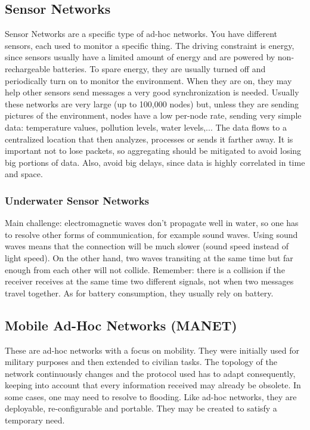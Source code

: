 \subsection{Sensor Networks}
Sensor Networks are a specific type of ad-hoc networks. You have 
different sensors, each used to monitor a specific thing. The driving constraint 
is energy, since sensors usually have a limited amount of energy and are powered 
by non-rechargeable batteries. To spare energy, they are usually turned off and 
periodically turn on to monitor the environment. 	When they are on, they 
may help other sensors send messages a very good synchronization is needed. 
Usually these networks are very large (up to 100,000 nodes) but, unless 
they are sending pictures of the environment, nodes have a low per-node rate, 
sending very simple data: temperature values, pollution levels, water 
levels,... 
The data flows to a centralized location that then analyzes, processes 
or sends it farther away.
It is important not to lose packets, so aggregating should be mitigated 
to avoid losing big portions of data. Also, avoid big delays, since data is 
highly correlated in time and space.

\subsubsection{Underwater Sensor Networks}
Main challenge: electromagnetic waves don't propagate well in water, so 
one has to resolve other forms of communication, for example sound waves.
Using sound waves means that the connection will be much slower (sound 
speed instead of light speed). On the other hand, two waves transiting at the
same time but far enough from each other will not collide. Remember: there is a 
collision if the receiver receives at the same time two different signals, not 
when two messages travel together.
As for battery consumption, they usually rely on battery.

\subsection{Mobile Ad-Hoc Networks (MANET)}
These are ad-hoc networks with a focus on mobility. They were initially 
used for military purposes and then extended to civilian tasks. The topology of 
the network continuously changes and the protocol used has to adapt 
consequently, keeping into account that every information received may already 
be obsolete. In some cases, one may need to resolve to flooding. Like ad-hoc 
networks, they are deployable, re-configurable and portable. They may be created 
to satisfy a temporary need.

